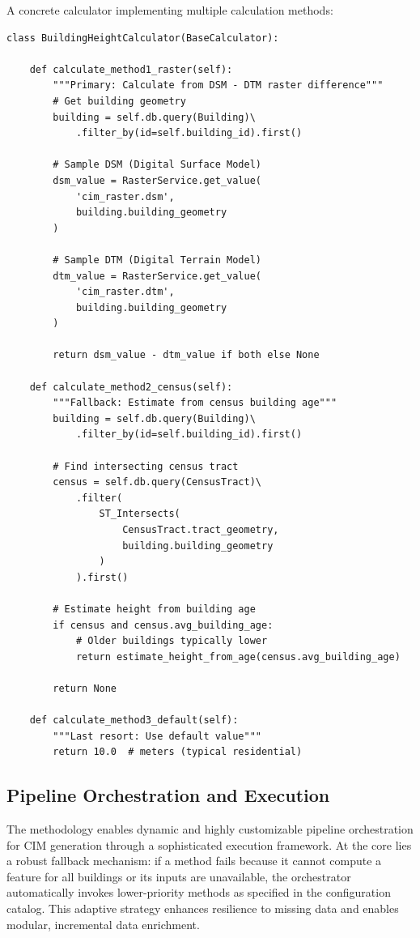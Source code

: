 A concrete calculator implementing multiple calculation methods:

\begin{lstlisting}[style=pythonstyle, caption=Building height calculator with multiple methods]
class BuildingHeightCalculator(BaseCalculator):
    
    def calculate_method1_raster(self):
        """Primary: Calculate from DSM - DTM raster difference"""
        # Get building geometry
        building = self.db.query(Building)\
            .filter_by(id=self.building_id).first()
        
        # Sample DSM (Digital Surface Model)
        dsm_value = RasterService.get_value(
            'cim_raster.dsm', 
            building.building_geometry
        )
        
        # Sample DTM (Digital Terrain Model)
        dtm_value = RasterService.get_value(
            'cim_raster.dtm', 
            building.building_geometry
        )
        
        return dsm_value - dtm_value if both else None
    
    def calculate_method2_census(self):
        """Fallback: Estimate from census building age"""
        building = self.db.query(Building)\
            .filter_by(id=self.building_id).first()
        
        # Find intersecting census tract
        census = self.db.query(CensusTract)\
            .filter(
                ST_Intersects(
                    CensusTract.tract_geometry,
                    building.building_geometry
                )
            ).first()
        
        # Estimate height from building age
        if census and census.avg_building_age:
            # Older buildings typically lower
            return estimate_height_from_age(census.avg_building_age)
        
        return None
    
    def calculate_method3_default(self):
        """Last resort: Use default value"""
        return 10.0  # meters (typical residential)
\end{lstlisting}

\subsection{Pipeline Orchestration and Execution}
\label{subsec:pipeline_orchestration}

The methodology enables dynamic and highly customizable pipeline orchestration for CIM generation through a sophisticated execution framework. At the core lies a robust fallback mechanism: if a method fails because it cannot compute a feature for all buildings or its inputs are unavailable, the orchestrator automatically invokes lower-priority methods as specified in the configuration catalog. This adaptive strategy enhances resilience to missing data and enables modular, incremental data enrichment.

